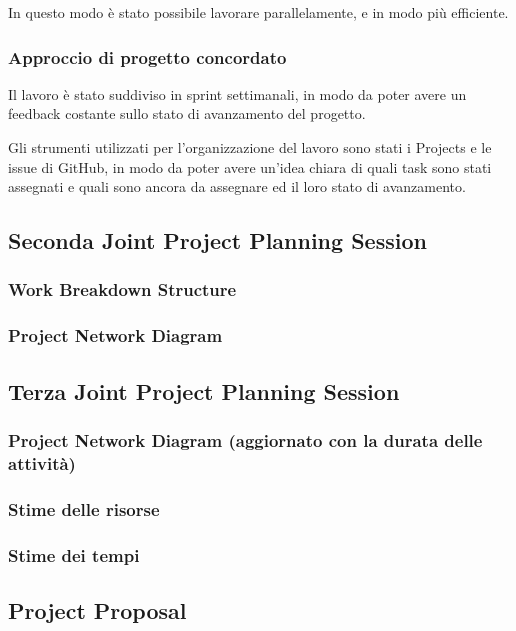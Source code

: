 In questo modo è stato possibile lavorare parallelamente, e in modo più efficiente.

\subsubsection{Approccio di progetto concordato}
Il lavoro è stato suddiviso in sprint settimanali, in modo da poter avere un feedback costante sullo stato di avanzamento
del progetto.

Gli strumenti utilizzati per l'organizzazione del lavoro sono stati i Projects e le issue di GitHub, in modo da poter
avere un'idea chiara di quali task sono stati assegnati e quali sono ancora da assegnare ed il loro stato di avanzamento.


\subsection{Seconda Joint Project Planning Session}


\subsubsection{Work Breakdown Structure}
\subsubsection{Project Network Diagram}

\subsection{Terza Joint Project Planning Session}
\subsubsection{Project Network Diagram (aggiornato con la durata delle attività)}
\subsubsection{Stime delle risorse}
\subsubsection{Stime dei tempi}

\subsection{Project Proposal}

